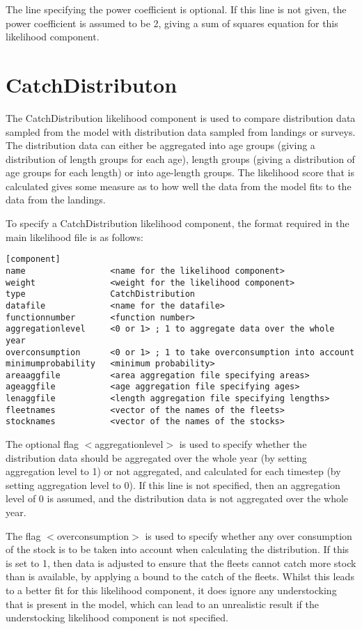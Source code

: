\documentclass [a4paper, 10pt]{book}
\begin{document}
The line specifying the power coefficient is optional.  If this line is not given, the power coefficient is assumed to be 2, giving a sum of squares equation for this likelihood component.

\section{CatchDistributon}\label{sec:catchdist}
The CatchDistribution likelihood component is used to compare distribution data sampled from the model with distribution data sampled from landings or surveys.  The distribution data can either be aggregated into age groups (giving a distribution of length groups for each age), length groups (giving a distribution of age groups for each length) or into age-length groups.  The likelihood score that is calculated gives some measure as to how well the data from the model fits to the data from the landings.

\bigskip
To specify a CatchDistribution likelihood component, the format required in the main likelihood file is as follows:

\begin{verbatim}
[component]
name                 <name for the likelihood component>
weight               <weight for the likelihood component>
type                 CatchDistribution
datafile             <name for the datafile>
functionnumber       <function number>
aggregationlevel     <0 or 1> ; 1 to aggregate data over the whole year
overconsumption      <0 or 1> ; 1 to take overconsumption into account
minimumprobability   <minimum probability>
areaaggfile          <area aggregation file specifying areas>
ageaggfile           <age aggregation file specifying ages>
lenaggfile           <length aggregation file specifying lengths>
fleetnames           <vector of the names of the fleets>
stocknames           <vector of the names of the stocks>
\end{verbatim}

The optional flag $<$aggregationlevel$>$ is used to specify whether the distribution data should be aggregated over the whole year (by setting aggregation level to 1) or not aggregated, and calculated for each timestep (by setting aggregation level to 0).  If this line is not specified, then an aggregation level of 0 is assumed, and the distribution data is not aggregated over the whole year.

\bigskip
The flag $<$overconsumption$>$ is used to specify whether any over consumption of the stock is to be taken into account when calculating the distribution.  If this is set to 1, then data is adjusted to ensure that the fleets cannot catch more stock than is available, by applying a bound to the catch of the fleets.  Whilst this leads to a better fit for this likelihood component, it does ignore any understocking that is present in the model, which can lead to an unrealistic result if the understocking likelihood component is not specified.
\end{document}
